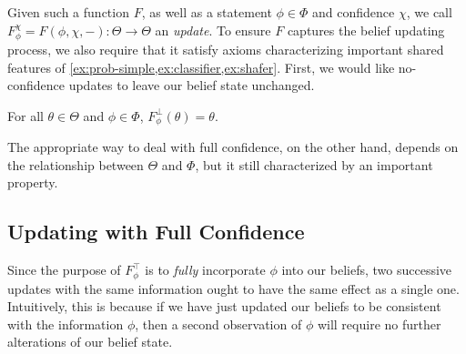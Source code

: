 Given such a function $F$, as well as a statement $\phi \in \Phi$
and confidence 
$\chi$, 
we call 
$F^\chi_\phi = F(\phi, \chi, -) : \Theta \to \Theta$
an \emph{update}.
To ensure $F$ captures the belief updating process, we also require
that it satisfy axioms
characterizing important shared features of
\cref{ex:prob-simple,ex:classifier,ex:shafer}.
First, we would like no-confidence updates to leave our belief state unchanged. 

\begin{CFaxioms}
	\item
		For all $\theta \in \Theta$ and $\phi \in \Phi$,
		 $F^{\bot}_\phi(\theta) = \theta$.
		\label{ax:zero}
\end{CFaxioms}


The appropriate way to deal with full confidence, on the other hand,
depends on the relationship between $\Theta$ and $\Phi$,
but it still characterized by an important property.


\subsection{Updating with Full Confidence}
Since the purpose of
$F^\top_\phi$
is to \emph{fully} incorporate $\phi$ into our beliefs,
two successive updates with the same information ought to have the same effect as a single one.
Intuitively, this is because if we have just updated our beliefs to be consistent with the information $\phi$, then a second observation of $\phi$ will require no further alterations of our belief state.

